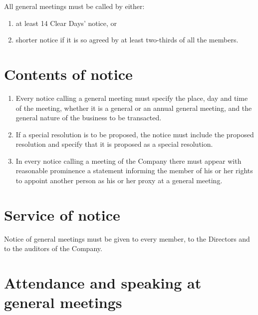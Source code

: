 \documentclass[a4paper,12pt]{article}
\begin{document}
All general meetings must be called by either:

\begin{enumerate}
  \item at least 14 Clear Days' notice, or
  \item shorter notice if it is so agreed by at least two-thirds of all the members.
\end{enumerate}

\section{Contents of notice}

\begin{enumerate}
  \item Every notice calling a general meeting must specify the place, day and time of the meeting, whether it is a general or an annual general meeting, and the general nature of the business to be transacted.
  \item If a special resolution is to be proposed, the notice must include the proposed resolution and specify that it is proposed as a special resolution.
  \item In every notice calling a meeting of the Company there must appear with reasonable prominence a statement informing the member of his or her rights to appoint another person as his or her proxy at a general meeting.
\end{enumerate}

\section{Service of notice}

Notice of general meetings must be given to every member, to the Directors and to the auditors of the Company.

\section{Attendance and speaking at general meetings}
\end{document}
